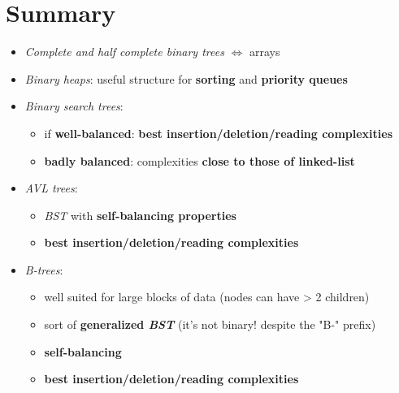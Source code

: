 \documentclass{beamer}[10pt, usepdftitle=false, handout]
\begin{document}
	
	\section{Summary}
	
	\begin{frame}
	
	\begin{itemize}
	\item {\textit{Complete and half complete binary trees} $\Leftrightarrow$ arrays}
	\item {\textit{Binary heaps}: useful structure for \textbf{sorting} and \textbf{priority queues}}
	\item {\textit{Binary search trees}:
		\begin{itemize}
			\item {if \textbf{well-balanced}: \textbf{best insertion/deletion/reading complexities}}
			\item {\textbf{badly balanced}: complexities \textbf{close to those of linked-list}}
		\end{itemize}	
	}	
	\item {\textit{AVL trees}:
		\begin{itemize}
			\item {\textit{BST} with \textbf{self-balancing properties}}
			\item {\textbf{best insertion/deletion/reading complexities}}
		\end{itemize}			
	}	
	\item {\textit{B-trees}:
		\begin{itemize}
			\item {well suited for large blocks of data (nodes can have > 2 children)}
			\item {sort of \textbf{generalized \textit{BST}} (it's not binary! despite the "B-" prefix)}
			\item {\textbf{self-balancing}}
			\item {\textbf{best insertion/deletion/reading complexities}}
		\end{itemize}
	}
	\end{itemize}
	
	
	
	

	
	\end{frame}
	
\end{document}
